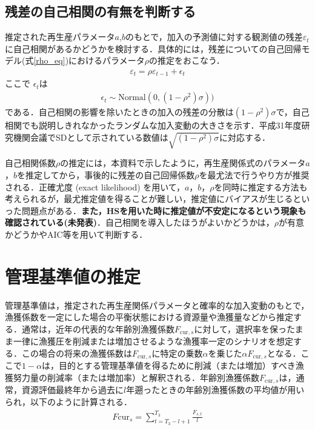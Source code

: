 \documentclass[11pt]{jsarticle}
\begin{document}
\subsection{残差の自己相関の有無を判断する\label{estrho}}
推定された再生産パラメータ$a$,$b$のもとで，加入の予測値に対する観測値の残差$\varepsilon_t$に自己相関があるかどうかを検討する．具体的には，残差についての自己回帰モデル(式\ref{rho_eq})におけるパラメータ$\rho$の推定をおこなう．
\begin{eqnarray}
  \varepsilon_t = \rho \varepsilon_{t-1} + \epsilon_t
  \label{rho_eq}
\end{eqnarray}
ここで $\epsilon_t$は
\begin{eqnarray}
  \epsilon_t \sim \mathrm{Normal}(0, (1-\rho^2) \sigma))
\end{eqnarray}
である．自己相関の影響を除いたときの加入の残差の分散は$(1-\rho^2) \sigma$で，自己相関でも説明しきれなかったランダムな加入変動の大きさを示す．平成31年度研究機関会議でSDとして示されている数値は$\sqrt{(1-\rho^2) \sigma}$に対応する．

自己相関係数$\rho$の推定には，本資料で示したように，再生産関係式のパラメータ$a$，$b$を推定してから，事後的に残差の自己回帰係数$\rho$を最尤法で行うやり方が推奨される．正確尤度 (exact likelihood) を用いて，$a$，$b$，$\rho$を同時に推定する方法も考えられるが，最尤推定値を得ることが難しい，推定値にバイアスが生じるといった問題点がある\cite{johnson}．{\bf また，HSを用いた時に推定値が不安定になるという現象も確認されている(未発表)}．自己相関を導入したほうがよいかどうかは，$\rho$が有意かどうかやAIC等を用いて判断する．

\section{管理基準値の推定}
管理基準値は，推定された再生産関係パラメータと確率的な加入変動のもとで，漁獲係数を一定にした場合の平衡状態における資源量や漁獲量などから推定する．通常は，近年の代表的な年齢別漁獲係数$F_{\mathrm{cur},s}$に対して，選択率を保ったまま一律に漁獲圧を削減または増加させるような漁獲率一定のシナリオを想定する．この場合の将来の漁獲係数は$F_{\mathrm{cur},s}$に特定の乗数$\alpha$を乗じた$\alpha F_{\mathrm{cur},s}$となる．ここで$1-\alpha$は，目的とする管理基準値を得るために削減（または増加）すべき漁獲努力量の削減率（または増加率）と解釈される．年齢別漁獲係数$F_{\mathrm{cur},s}$は，通常，資源評価最終年から過去に$l$年遡ったときの年齢別漁獲係数の平均値が用いられ，以下のように計算される．
\begin{eqnarray}
  F\mathrm{cur}_s = \sum_{t=T_3-l+1}^{T_3}\frac{F_{s,t}}{l}
\end{eqnarray}
\end{document}
